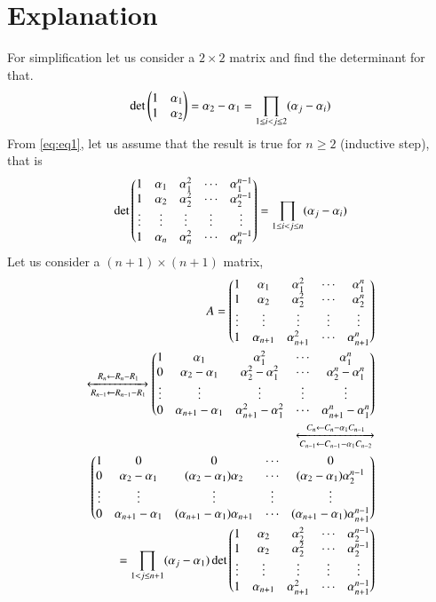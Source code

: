 \documentclass[journal,12pt,twocolumn]{IEEEtran}
\begin{document}
\section{Explanation}
For simplification let us consider a $2\times2$ matrix and find the determinant for that.
\begin{align}
    \det{\ensuremath{\begin{pmatrix}1&\alpha_1\\1&\alpha_2\end{pmatrix}}} = \alpha_2 - \alpha_1 = \prod_{1\leq i<j\leq2} (\alpha_{j}-\alpha_{i}) \label{eq:eq1}
\end{align}
From \eqref{eq:eq1}, let us assume that the result is true for $n\geq2$ (inductive step), that is
\begin{align}
    \det{\ensuremath{\begin{pmatrix}1&\alpha_1&\alpha_1^2&\cdots&\alpha_1^{n-1}\\1&\alpha_2&\alpha_2^2&\cdots&\alpha_2^{n-1}\\\vdots&\vdots&\vdots&\vdots&\vdots\\1&\alpha_n&\alpha_n^2&\cdots&\alpha_n^{n-1}\end{pmatrix}}} = \prod_{1\leq i<j\leq n} (\alpha_{j}-\alpha_{i}) \label{eq:eq2}
\end{align}
Let us consider a $(n+1)\times(n+1)$ matrix,
\begin{align}
    A = \begin{pmatrix}1&\alpha_1&\alpha_1^2&\cdots&\alpha_1^{n}\\1&\alpha_2&\alpha_2^2&\cdots&\alpha_2^{n}\\\vdots&\vdots&\vdots&\vdots&\vdots\\1&\alpha_{n+1}&\alpha_{n+1}^2&\cdots&\alpha_{n+1}^{n}\end{pmatrix}\\
\xleftrightarrow[R_{n-1}\leftarrow R_{n-1}-R_1]{R_n\leftarrow R_n-R_1}
\begin{pmatrix}1&\alpha_1&\alpha_1^2&\cdots&\alpha_1^{n}\\0&\alpha_2-\alpha_1&\alpha_2^2-\alpha_1^2&\cdots&\alpha_2^{n}-\alpha_1^{n}\\\vdots&\vdots&\vdots&\vdots&\vdots\\0&\alpha_{n+1}-\alpha_1&\alpha_{n+1}^2-\alpha_1^2&\cdots&\alpha_{n+1}^{n}-\alpha_1^{n}\end{pmatrix}\\
\xleftrightarrow[C_{n-1}\leftarrow C_{n-1}-\alpha_1 C_{n-2}]{C_n\leftarrow C_n-\alpha_1 C_{n-1}}\\
\begin{pmatrix}1&0&0&\cdots&0\\0&\alpha_2-\alpha_1&(\alpha_2-\alpha_1)\alpha_2&\cdots&(\alpha_2-\alpha_1)\alpha_2^{n-1}\\\vdots&\vdots&\vdots&\vdots&\vdots\\0&\alpha_{n+1}-\alpha_1&(\alpha_{n+1}-\alpha_1)\alpha_{n+1}&\cdots&(\alpha_{n+1}-\alpha_1)\alpha_{n+1}^{n-1}\end{pmatrix}\\
=\prod_{1< j\leq n+1} (\alpha_{j}-\alpha_{1}) \det{\ensuremath{\begin{pmatrix}1&\alpha_2&\alpha_2^2&\cdots&\alpha_2^{n-1}\\1&\alpha_2&\alpha_2^2&\cdots&\alpha_2^{n-1}\\\vdots&\vdots&\vdots&\vdots&\vdots\\1&\alpha_{n+1}&\alpha_{n+1}^2&\cdots&\alpha_{n+1}^{n-1}\end{pmatrix}}} \label{eq:eq3}
\end{align}
\end{document}
